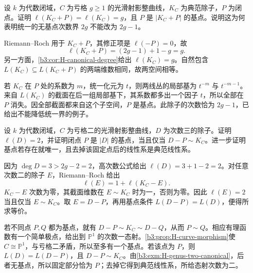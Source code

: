 \begin{exercise}\label{b3:ex:H-base-point-bound-sharp}
	设 \(k\) 为代数闭域，\(C\) 为亏格 \(g\ge1\) 的光滑射影整曲线，\(K_C\) 为典范除子，\(P\) 为闭点。证明 \(\ell(K_C+P)=\ell(K_C)=g\)，且 \(P\) 是 \(|K_C+P|\) 的基点。说明这为何表明统一的无基点次数界 \(2g\) 不能改为 \(2g-1\)。
\end{exercise}
\begin{solution}
	Riemann–Roch 用于 \(K_C+P\)，其修正项是 \(\ell(-P)=0\)，故
	\[
		\ell(K_C+P)=(2g-1)+1-g=g.
	\]
	另一方面，\cref{b3:cor:H-canonical-degree}给出 \(\ell(K_C)=g\)。自然包含 \(L(K_C)\subseteq L(K_C+P)\) 的两端维数相同，故两空间相等。

	若 \(K_C\) 在 \(P\) 处的系数为 \(m\)，统一化元为 \(t\)，则两线丛的局部基为 \(t^{-m}\) 与 \(t^{-m-1}\)。来自 \(L(K_C)\) 的截面在后一组局部基下，其系数都多出一个因子 \(t\)，所以全部在 \(P\) 消失。因全部截面都来自这个子空间，\(P\) 是基点。此除子的次数恰为 \(2g-1\)，已给出不能降低统一界的例子。
\end{solution}

\begin{exercise}\label{b3:ex:H-genus-two-degree-three}
	设 \(k\) 为代数闭域，\(C\) 为亏格二的光滑射影整曲线，\(D\) 为次数三的除子。证明 \(\ell(D)=2\)，并证明闭点 \(P\) 是 \(|D|\) 的基点，当且仅当 \(D-P\sim K_C\)。进一步证明基点若存在就唯一，且去掉该固定点后的线性系是典范线性系。
\end{exercise}
\begin{solution}
	因为 \(\deg D=3>2g-2=2\)，高次数公式给出 \(\ell(D)=3+1-2=2\)。对任意次数二的除子 \(E\)，Riemann–Roch 给出
	\[
		\ell(E)=1+\ell(K_C-E).
	\]
	\(K_C-E\) 次数为零，其截面维数在 \(E\sim K_C\) 时为一，否则为零。因此 \(\ell(E)=2\) 当且仅当 \(E\sim K_C\)。取 \(E=D-P\)，再用基点条件 \(L(D-P)=L(D)\)，便得所求等价。

	若不同点 \(P,Q\) 都为基点，就有 \(D-P\sim K_C\sim D-Q\)，从而 \(P\sim Q\)。相应有理函数有一个简单极点，给出到 \(\mathbb P^1\) 的次数一态射。\cref{b3:prop:H-curve-morphism}使 \(C\cong\mathbb P^1\)，与亏格二矛盾，所以至多有一个基点。若该点为 \(P\)，则 \(L(D)=L(D-P)\)，且 \(D-P\sim K_C\)。由\cref{b3:exm:H-genus-two-canonical}，后者无基点，所以固定部分恰为 \(P\)；去掉它得到典范线性系，所给态射次数为二。
\end{solution}

